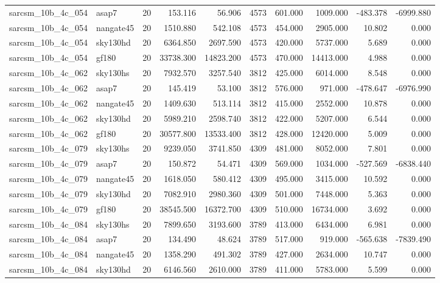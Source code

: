 \documentclass{article}
\begin{document}
\begin{longtable}{llrrrrrrrr}
sarcsm\_10b\_4c\_054 & asap7 & 20 & 153.116 & 56.906 & 4573 & 601.000 & 1009.000 & -483.378 & -6999.880 \\
sarcsm\_10b\_4c\_054 & nangate45 & 20 & 1510.880 & 542.108 & 4573 & 454.000 & 2905.000 & 10.802 & 0.000 \\
sarcsm\_10b\_4c\_054 & sky130hd & 20 & 6364.850 & 2697.590 & 4573 & 420.000 & 5737.000 & 5.689 & 0.000 \\
sarcsm\_10b\_4c\_054 & gf180 & 20 & 33738.300 & 14823.200 & 4573 & 470.000 & 14413.000 & 4.988 & 0.000 \\
sarcsm\_10b\_4c\_062 & sky130hs & 20 & 7932.570 & 3257.540 & 3812 & 425.000 & 6014.000 & 8.548 & 0.000 \\
sarcsm\_10b\_4c\_062 & asap7 & 20 & 145.419 & 53.100 & 3812 & 576.000 & 971.000 & -478.647 & -6976.990 \\
sarcsm\_10b\_4c\_062 & nangate45 & 20 & 1409.630 & 513.114 & 3812 & 415.000 & 2552.000 & 10.878 & 0.000 \\
sarcsm\_10b\_4c\_062 & sky130hd & 20 & 5989.210 & 2598.740 & 3812 & 422.000 & 5207.000 & 6.544 & 0.000 \\
sarcsm\_10b\_4c\_062 & gf180 & 20 & 30577.800 & 13533.400 & 3812 & 428.000 & 12420.000 & 5.009 & 0.000 \\
sarcsm\_10b\_4c\_079 & sky130hs & 20 & 9239.050 & 3741.850 & 4309 & 481.000 & 8052.000 & 7.801 & 0.000 \\
sarcsm\_10b\_4c\_079 & asap7 & 20 & 150.872 & 54.471 & 4309 & 569.000 & 1034.000 & -527.569 & -6838.440 \\
sarcsm\_10b\_4c\_079 & nangate45 & 20 & 1618.050 & 580.412 & 4309 & 495.000 & 3415.000 & 10.592 & 0.000 \\
sarcsm\_10b\_4c\_079 & sky130hd & 20 & 7082.910 & 2980.360 & 4309 & 501.000 & 7448.000 & 5.363 & 0.000 \\
sarcsm\_10b\_4c\_079 & gf180 & 20 & 38545.500 & 16372.700 & 4309 & 510.000 & 16734.000 & 3.692 & 0.000 \\
sarcsm\_10b\_4c\_084 & sky130hs & 20 & 7899.650 & 3193.600 & 3789 & 413.000 & 6434.000 & 6.981 & 0.000 \\
sarcsm\_10b\_4c\_084 & asap7 & 20 & 134.490 & 48.624 & 3789 & 517.000 & 919.000 & -565.638 & -7839.490 \\
sarcsm\_10b\_4c\_084 & nangate45 & 20 & 1358.290 & 491.302 & 3789 & 427.000 & 2634.000 & 10.747 & 0.000 \\
sarcsm\_10b\_4c\_084 & sky130hd & 20 & 6146.560 & 2610.000 & 3789 & 411.000 & 5783.000 & 5.599 & 0.000 \\

\end{longtable}
\end{document}
